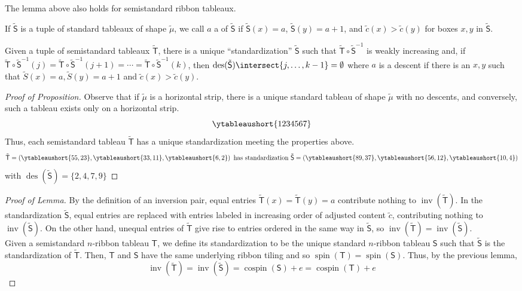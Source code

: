 \documentclass[11pt,leqno,oneside]{amsart}
\numberwithin{thm}{section}
\newcommand{\T}{\mathsf{T}} %
\renewcommand{\S}{\mathsf{S}}
\newcommand{\inv}{\operatorname{inv}}
\newcommand{\des}{\operatorname{des}}
\newcommand{\spin}{\operatorname{spin}}
\newcommand{\cospin}{\operatorname{cospin}}
\begin{document}
\begin{lem}
  The lemma above also holds for semistandard ribbon tableaux.
\end{lem}
\begin{defn}
  If \(\tilde{\S}\) is a tuple of standard tableaux of shape
  \(\tilde{\mu}\), we call \(a\) a  of \(\tilde{\S}\) if
  \(\tilde{\S}(x) = a\), \(\tilde{\S}(y) = a+1\), and \(\tilde{c}(x) >
  \tilde{c}(y)\) for boxes \(x,y\) in \(\tilde{\S}\).
\end{defn}
\begin{prop}
  Given a tuple of semistandard tableaux \(\tilde{\T}\), there is a
  unique ``standardization'' \(\tilde{\S}\) such that \(\tilde{\T} \circ
  \tilde{\S}^{-1}\) is weakly increasing and, if \(\tilde{\T} \circ \tilde{\S}^{-1}(j) = \tilde{\T}
  \circ \tilde{\S}^{-1}(j+1) = \cdots = \tilde{\T} \circ \tilde{\S}^{-1}(k)\), then \(\des(\tilde{\S})
  \intersect \{j, \ldots, k-1\} = \emptyset\) where \(a\) is a descent
  if there is an \(x,y\) such that \(\tilde{S}(x) = a, \tilde{S}(y) =
  a+1\) and \(\tilde{c}(x) > \tilde{c}(y)\).
\end{prop}
\begin{proof}[Proof of Proposition]
  Observe that if \(\tilde{\mu}\) is a horizontal strip, there is a
  unique standard tableau of shape \(\tilde{\mu}\) with no descents,
  and conversely, such a tableau exists only on a horizontal strip. \[
    \ytableaushort{1234567}
  \]
  Thus, each semistandard tableau \(\tilde{\T}\) has a unique
  standardization meeting the properties above.
  \[
    \tilde{\T} = \left( \ytableaushort{55,23}, \ytableaushort{33,11},
      \ytableaushort{6,2} \right) \text{ has standardization }
    \tilde{\S} = \left(
      \ytableaushort{89,37}, \ytableaushort{56,12}, \ytableaushort{{10},4} \right)
  \]
  with \(\des(\tilde{\S}) = \{2,4,7,9\}\)
\end{proof}
\begin{proof}[Proof of Lemma]
  By the definition of an inversion pair, equal entries \(\tilde{\T}(x) =
  \tilde{\T}(y) = a\) contribute nothing to \(\inv(\tilde{\T})\). In
  the standardization \(\tilde{\S}\), equal entries are replaced with
  entries labeled in increasing order of adjusted content
  \(\tilde{c}\), contributing nothing to \(\inv(\tilde{\S})\). On the
  other hand, unequal entries of \(\tilde{\T}\) give rise to entries
  ordered in the same way in \(\tilde{\S}\), so \(\inv(\tilde{\T}) =
  \inv(\tilde{\S})\). \\

  Given a semistandard \(n\)-ribbon tableau \(\T\), we define its
  standardization to be the unique standard \(n\)-ribbon tableau
  \(\S\) such that \(\tilde{\S}\) is the standardization of
  \(\tilde{\T}\). Then, \(\T\) and \(\S\) have the same underlying
  ribbon tiling and so \(\spin(\T) = \spin(\S)\). Thus, by the
  previous lemma, \[
    \inv(\tilde{\T}) = \inv(\tilde{\S}) = \cospin(\S)+e = \cospin(\T)+e
  \]
\end{proof}
\end{document}
